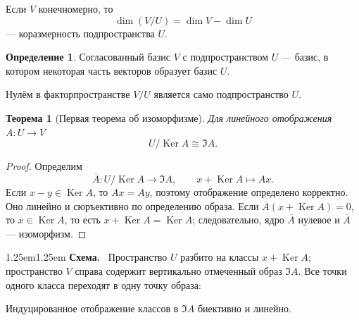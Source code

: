 \documentclass[12pt,a4paper,oneside,openany]{book}
\theoremstyle{definition}
\newtheorem{definition}{Определение}[chapter]
\theoremstyle{plain}
\newtheorem{theorem}{Теорема}[chapter]
\theoremstyle{remark}
\newenvironment{visualreconstruction}
  {\begin{adjustwidth}{1.25em}{1.25em}\small
   \noindent\textcolor{logicgray}{\sffamily\bfseries Схема.}\ }
  {\par\end{adjustwidth}}
\DeclareMathOperator{\Ker}{Ker}
\begin{document}
Если $V$ конечномерно, то
\[
  \dim(V/U)=\dim V-\dim U
\]
--- коразмерность подпространства $U$.

\begin{definition}
Согласованный базис $V$ с подпространством $U$ --- базис, в котором
некоторая часть векторов образует базис $U$.
\end{definition}

Нулём в факторпространстве $V/U$ является само подпространство $U$.

\begin{theorem}[Первая теорема об изоморфизме]
Для линейного отображения $A\colon U\to V$
\[
  U/\Ker A\cong\Im A.
\]
\end{theorem}

\begin{proof}
Определим
\[
  \overline A\colon U/\Ker A\to\Im A,\qquad
  x+\Ker A\longmapsto Ax.
\]
Если $x-y\in\Ker A$, то $Ax=Ay$, поэтому отображение определено
корректно. Оно линейно и сюръективно по определению образа. Если
$\overline A(x+\Ker A)=0$, то $x\in\Ker A$, то есть
$x+\Ker A=\Ker A$; следовательно, ядро $\overline A$ нулевое и
$\overline A$ --- изоморфизм.
\end{proof}

\begin{visualreconstruction}
Пространство $U$ разбито на классы $x+\Ker A$; пространство $V$ справа
содержит вертикально отмеченный образ $\Im A$. Все точки одного класса
переходят в одну точку образа:
\begin{center}
\end{center}
Индуцированное отображение классов в $\Im A$ биективно и линейно.
\end{visualreconstruction}
\end{document}

